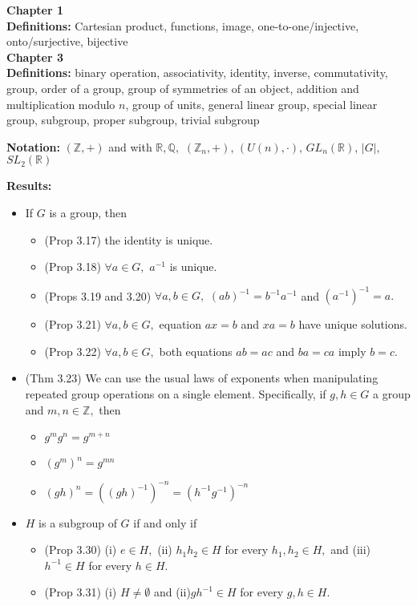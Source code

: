 \documentclass[12pt]{article}
\newcommand{\bbZ}{\mathbb{Z}}
\newcommand{\bbR}{\mathbb{R}}
\newcommand{\bbQ}{\mathbb{Q}}
\begin{document}
\noindent \textbf{Chapter 1}\\

\textbf{Definitions:} Cartesian product, functions, image, one-to-one/injective, onto/surjective, bijective\\

\noindent \textbf{Chapter 3}\\

\textbf{Definitions:} binary operation, associativity, identity, inverse, commutativity, group, order of a group, group of symmetries of an object, addition and multiplication modulo $n$, group of units, general linear group, special linear group, subgroup, proper subgroup, trivial subgroup

\textbf{Notation:} $(\bbZ,+)$ and with $\bbR,\bbQ,$  $(\bbZ_n,+)$, $(U(n), \cdot )$, $GL_n(\bbR)$, $|G|$, $SL_2(\bbR)$

\textbf{Results:}
\begin{itemize}
	\item If $G$ is a group, then
		\begin{itemize}
		\item (Prop 3.17) the identity is unique.
		\item (Prop 3.18) $\forall a \in G,$ $a^{-1}$ is unique.
		\item (Props 3.19 and 3.20) $\forall a,b \in G,$ $(ab)^{-1}=b^{-1}a^{-1}$ and $(a^{-1})^{-1}=a.$
		\item (Prop 3.21) $\forall a,b \in G,$ equation $ax=b$ and $xa=b$ have unique solutions.
		\item (Prop 3.22) $\forall a,b \in G,$ both equations $ab=ac$ and $ba=ca$ imply $b=c.$
		\end{itemize}
	\item (Thm 3.23) We can use the usual laws of exponents when manipulating repeated group operations on a single element. Specifically, if $g,h \in G$ a group and $m,n \in \bbZ,$ then
		\begin{itemize}
		\item $g^mg^n=g^{m+n}$
		\item $(g^m)^n=g^{mn}$
		\item $(gh)^n=((gh)^{-1})^{-n}=(h^{-1}g^{-1})^{-n}$
		\end{itemize}
	\item $H$ is a subgroup of $G$ if and only if
		\begin{itemize}
		\item (Prop 3.30) (i) $e \in H,$ (ii) $h_1h_2 \in H$ for every $h_1,h_2 \in H,$ and (iii) $h^{-1} \in H$ for every $h \in H.$
		\item (Prop 3.31) (i) $H \not= \emptyset$ and (ii)$gh^{-1} \in H$ for every $g,h \in H.$
		\end{itemize}
\end{itemize}
\end{document}
